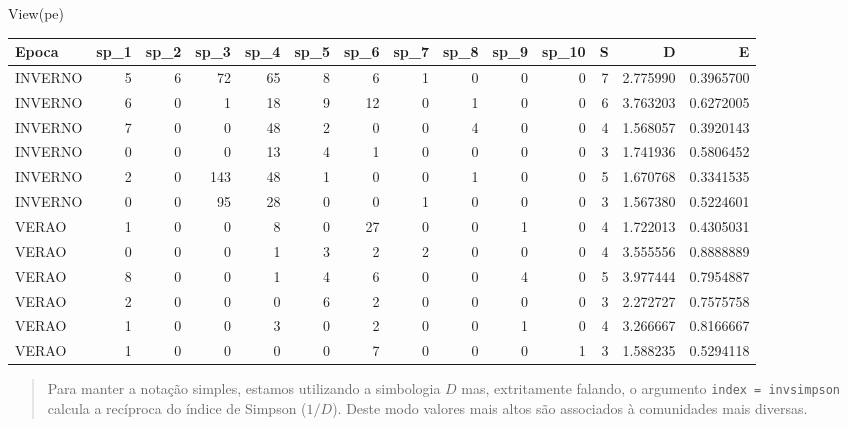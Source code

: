 \documentclass[
]{book}
\newenvironment{Shaded}{\begin{snugshade}}{\end{snugshade}}
\newcommand{\FunctionTok}[1]{\textcolor[rgb]{0.00,0.00,0.00}{#1}}
\newcommand{\NormalTok}[1]{#1}
\begin{document}
\begin{Shaded}
\begin{Highlighting}[]
\FunctionTok{View}\NormalTok{(pe)}
\end{Highlighting}
\end{Shaded}

\begin{table}
\centering\begingroup\fontsize{10}{12}\selectfont

\begin{tabular}{l|r|r|r|r|r|r|r|r|r|r|r|r|r}
\hline
Epoca & sp\_1 & sp\_2 & sp\_3 & sp\_4 & sp\_5 & sp\_6 & sp\_7 & sp\_8 & sp\_9 & sp\_10 & S & D & E\\
\hline
INVERNO & 5 & 6 & 72 & 65 & 8 & 6 & 1 & 0 & 0 & 0 & 7 & 2.775990 & 0.3965700\\
\hline
INVERNO & 6 & 0 & 1 & 18 & 9 & 12 & 0 & 1 & 0 & 0 & 6 & 3.763203 & 0.6272005\\
\hline
INVERNO & 7 & 0 & 0 & 48 & 2 & 0 & 0 & 4 & 0 & 0 & 4 & 1.568057 & 0.3920143\\
\hline
INVERNO & 0 & 0 & 0 & 13 & 4 & 1 & 0 & 0 & 0 & 0 & 3 & 1.741936 & 0.5806452\\
\hline
INVERNO & 2 & 0 & 143 & 48 & 1 & 0 & 0 & 1 & 0 & 0 & 5 & 1.670768 & 0.3341535\\
\hline
INVERNO & 0 & 0 & 95 & 28 & 0 & 0 & 1 & 0 & 0 & 0 & 3 & 1.567380 & 0.5224601\\
\hline
VERAO & 1 & 0 & 0 & 8 & 0 & 27 & 0 & 0 & 1 & 0 & 4 & 1.722013 & 0.4305031\\
\hline
VERAO & 0 & 0 & 0 & 1 & 3 & 2 & 2 & 0 & 0 & 0 & 4 & 3.555556 & 0.8888889\\
\hline
VERAO & 8 & 0 & 0 & 1 & 4 & 6 & 0 & 0 & 4 & 0 & 5 & 3.977444 & 0.7954887\\
\hline
VERAO & 2 & 0 & 0 & 0 & 6 & 2 & 0 & 0 & 0 & 0 & 3 & 2.272727 & 0.7575758\\
\hline
VERAO & 1 & 0 & 0 & 3 & 0 & 2 & 0 & 0 & 1 & 0 & 4 & 3.266667 & 0.8166667\\
\hline
VERAO & 1 & 0 & 0 & 0 & 0 & 7 & 0 & 0 & 0 & 1 & 3 & 1.588235 & 0.5294118\\
\hline
\end{tabular}
\endgroup{}
\end{table}

\begin{quote}
Para manter a notação simples, estamos utilizando a simbologia \(D\) mas, extritamente falando, o argumento \texttt{index\ =\ \textquotesingle{}invsimpson\textquotesingle{}} calcula a recíproca do índice de Simpson (\(1/D\)). Deste modo valores mais altos são associados à comunidades mais diversas.
\end{quote}
\end{document}
